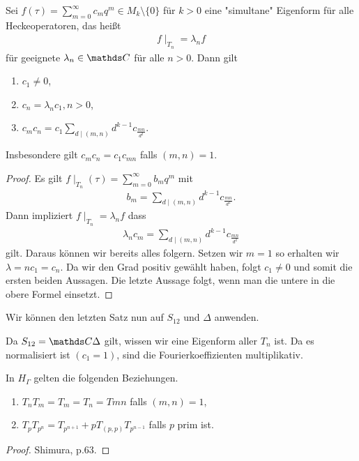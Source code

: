 \begin{prop}
Sei $f(\tau)=\sum_{m=0}^\infty c_mq^m \in M_k\setminus \{0\}$ für $k>0$ eine "simultane"
Eigenform für alle Heckeoperatoren, das heißt
\begin{align*}
f\mid_{T_n}=\lambda_n f
\end{align*}
für geeignete $\lambda_n \in \C$ für alle $n>0$.
Dann gilt
\begin{enumerate}
\item $c_1\not =0$,
\item $c_n=\lambda_n c_1,n>0$,
\item $c_mc_n=c_1\sum_{d\mid (m,n)} d^{k-1} c_{\frac{mn}{d^2}}$. 
\end{enumerate}
Insbesondere gilt
$c_mc_n=c_1c_{mn}$ falls $(m,n)=1$.
\end{prop}
\begin{proof}
Es gilt $f\mid_{T_n}(\tau)=\sum_{m=0}^\infty b_mq^m$ mit
\begin{align*}
b_m=\sum_{d \mid (m,n)} d^{k-1} c_{\frac{mn}{d^2}}.
\end{align*}
Dann impliziert $f\mid_{T_n}=\lambda_n f$ dass
\begin{align*}
\lambda_n c_m=\sum_{d\mid (m,n)} d^{k-1} c_{\frac{mn}{d^2}}
\end{align*}
gilt.
Daraus können wir bereits alles folgern.
Setzen wir $m=1$ so erhalten wir $\lambda=nc_1=c_n$.
Da wir den Grad positiv gewählt haben, folgt $c_1\not =0$ und somit die ersten beiden Aussagen.
Die letzte Aussage folgt, wenn man die untere in die obere Formel einsetzt.
\end{proof}

Wir können den letzten Satz nun auf $S_{12}$ und $\Delta$ anwenden.

\begin{bsp}
Da $S_{12}=\C\Delta$ gilt, wissen wir eine Eigenform aller $T_n$ ist.
Da es normalisiert ist $(c_1=1)$, sind die Fourierkoeffizienten multiplikativ.
\end{bsp}

\begin{prop}
In $H_\Gamma$ gelten die folgenden Beziehungen.
\begin{enumerate}
\item $T_n T_m=T_m=T_n=T{mn}$ falls $(m,n)=1$,
\item $T_p T_{p^n}=T_{p^{n+1}}+pT_{(p,p)}T_{p^{n-1}}$ falls $p$ prim ist.
\end{enumerate}
\end{prop}
\begin{proof}
Shimura, p.63.
\end{proof}


